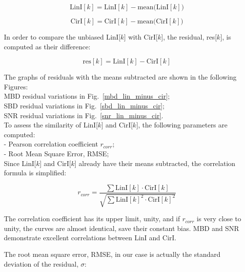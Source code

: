\documentclass[letterpaper,twoside,12pt]{article}
\begin{document}
\begin{equation}
  \label{subtr_mean_lin}
  \mathrm{LinI}[k] = \mathrm{LinI}[k] - \mathrm{mean(LinI}[k])
\end{equation}

\begin{equation}
  \label{subtr_mean_cir}
  \mathrm{CirI}[k] = \mathrm{CirI}[k] - \mathrm{mean(CirI}[k])
\end{equation}

\noindent In order to compare the unbiased LinI[$k$] with CirI[$k$], the residual, res[$k$], is computed as their difference:

\begin{equation}
  \label{resid}
  \mathrm{res}[k] = \mathrm{LinI}[k] - \mathrm{CirI}[k] 
\end{equation}

\noindent The graphs of residuals with the means subtracted are shown in the following Figures: \\

\indent MBD residual variations in Fig.~\ref{mbd_lin_minus_cir};  \\
\indent SBD residual variations in Fig.~\ref{sbd_lin_minus_cir};  \\
\indent SNR residual variations in Fig.~\ref{snr_lin_minus_cir}.  \\

To assess the similarity of LinI[$k$] and CirI[$k$], the following parameters are computed: \\

\noindent - Pearson correlation coefficient $r_{corr}$; \\
\noindent - Root Mean Square Error, RMSE; \\

Since LinI[$k$] and CirI[$k$] already have their means subtracted, the correlation formula is simplified:

\begin{equation}
  \label{corr}
  r_{corr} = \frac{\sum \mathrm{LinI}[k] \cdot \mathrm{CirI}[k]}{\sqrt{\sum \mathrm{LinI}[k]^2 \cdot 
                   \mathrm{CirI}[k]^2}}
\end{equation}

The correlation coefficient has its upper limit, unity, and if $r_{corr}$ is very close to unity, the curves are almost identical, save their constant bias. MBD and SNR demonstrate excellent correlations between LinI and CirI.

The root mean square error, RMSE, in our case is actually the standard deviation of the residual, $\sigma$:
\end{document}
